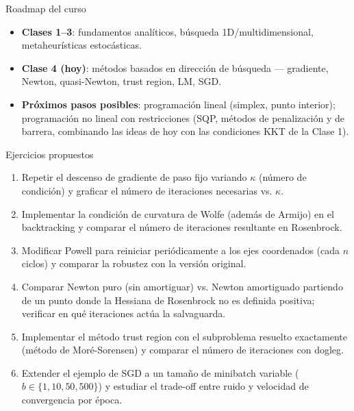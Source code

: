 \documentclass[aspectratio=169]{beamer}
\begin{document}
\begin{frame}{Roadmap del curso}
  \begin{itemize}
    \item \textbf{Clases 1--3}: fundamentos anal\'iticos, b\'usqueda 1D/multidimensional, metaheur\'isticas estoc\'asticas.
    \item \textbf{Clase 4 (hoy)}: m\'etodos basados en direcci\'on de b\'usqueda --- gradiente, Newton, quasi-Newton, trust region, LM, SGD.
    \item \textbf{Pr\'oximos pasos posibles}: programaci\'on lineal (simplex, punto interior); programaci\'on no lineal con restricciones (SQP, m\'etodos de penalizaci\'on y de barrera, combinando las ideas de hoy con las condiciones KKT de la Clase 1).
  \end{itemize}
\end{frame}

\begin{frame}{Ejercicios propuestos}
  \small
  \begin{enumerate}
    \item Repetir el descenso de gradiente de paso fijo variando $\kappa$ (n\'umero de condici\'on) y graficar el n\'umero de iteraciones necesarias vs. $\kappa$.
    \item Implementar la condici\'on de curvatura de Wolfe (adem\'as de Armijo) en el backtracking y comparar el n\'umero de iteraciones resultante en Rosenbrock.
    \item Modificar Powell para reiniciar peri\'odicamente a los ejes coordenados (cada $n$ ciclos) y comparar la robustez con la versi\'on original.
    \item Comparar Newton puro (sin amortiguar) vs. Newton amortiguado partiendo de un punto donde la Hessiana de Rosenbrock no es definida positiva; verificar en qu\'e iteraciones act\'ua la salvaguarda.
    \item Implementar el m\'etodo trust region con el subproblema resuelto exactamente (m\'etodo de Mor\'e-Sorensen) y comparar el n\'umero de iteraciones con dogleg.
    \item Extender el ejemplo de SGD a un tama\~no de minibatch variable ($b\in\{1,10,50,500\}$) y estudiar el trade-off entre ruido y velocidad de convergencia por \'epoca.
  \end{enumerate}
\end{frame}
\end{document}
